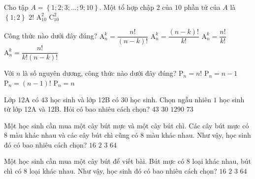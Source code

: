 \begin{ex}%
	Cho tập $A=\left\{1;2;3;\ldots;9;10\right\}$. Một tổ hợp chập $2$ của $10$ phần tử của $A$ là
	\choice
	{\True $\left\{1;2\right\}$}
	{$2!$}
	{$\mathrm{A}^2_{10}$}
	{$\mathrm{C}^2_{10}$}
\end{ex}
\begin{ex}%
	Công thức nào dưới đây đúng?
	\choice
	{\True $\mathrm{A}^k_n=\dfrac{n!}{(n-k)!}$}
	{$\mathrm{A}^k_n=\dfrac{(n-k)!}{k!}$}
	{$\mathrm{A}^k_n=\dfrac{n!}{k!}$}
	{$\mathrm{A}^k_n=\dfrac{n!}{k!(n-k)!}$}
\end{ex}
\begin{ex}%
	Với $n$ là số nguyên dương, công thức nào dưới đây đúng?
	\choice
	{\True $\mathrm{P}_n=n!$}
	{$\mathrm{P}_n=n-1$}
	{$\mathrm{P}_n=(n-1)!$}
	{$\mathrm{P}_n=n$}
\end{ex}
\begin{ex}%
	Lớp 12A có $43$ học sinh và lớp 12B có $30$ học sinh. Chọn ngẫu nhiên $1$ học sinh từ lớp 12A và 12B. Hỏi có bao nhiêu cách chọn?
	\choice
	{$43$}
	{$30$}
	{$1290$}
	{\True $73$}
\end{ex}
\begin{ex}%
	Một học sinh cần mua một cây bút mực và một cây bút chì. Các cây bút mực có $8$ màu khác nhau và các cây bút chì cũng có $8$ màu khác nhau. Như vậy, học sinh đó có bao nhiêu cách chọn?
	\choice
	{$16$}
	{$2$}
	{$3$}
	{\True $64$}
\end{ex}
\begin{ex}%
	Một học sinh cần mua một cây bút để viết bài. Bút mực có $8$ loại khác nhau, bút chì có $8$ loại khác nhau. Như vậy, học sinh đó có bao nhiêu cách chọn?
	\choice
	{\True $16$}
{$2$}
{$3$}
{$64$}
\end{ex}

